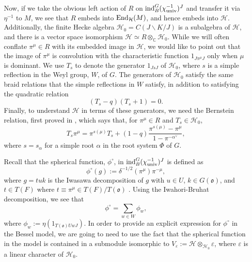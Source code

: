 \documentclass[11pt,letterpaper]{article}
\newcommand{\C}{\mathbb{C}}
\newcommand{\calH}{\mathcal{H}} %
\newcommand{\ve}{\varepsilon}
\newcommand{\bs}{\backslash}
\newcommand{\goth}{\mathfrak}
\newcommand{\End}{\textup{End}}
\newcommand{\ind}{\textup{ind}}
\theoremstyle{remark}
\numberwithin{equation}{section}
\begin{document}
Now, if we take the obvious left action of $R$ on $\ind_B^G(\chi_{\textup{univ}}^{-1})^J$ and transfer it via $\eta^{-1}$ to $M$, we see that $R$ embeds into $\End_{\calH}(M)$, and hence embeds into $\calH$. Additionally, the finite Hecke algebra $\calH_0 = C(J\bs K/J)$ is a subalgebra of $\calH$, and there is a vector space isomorphism $\calH \simeq R \otimes_{\C} \calH_0$. While we will often conflate $\pi^{\mu} \in R$ with its embedded image in $\calH$, we would like to point out that the image of $\pi^{\mu}$ is convolution with the characteristic function $1_{J\pi^{\mu}J}$ only when $\mu$ is dominant. We use $T_{s}$ to denote the generator $1_{JsJ}$ of $\calH_0$, where $s$ is a simple reflection in the Weyl group, $W$, of $G$. The generators of $\calH_0$ satisfy the same braid relations that the simple reflections in $W$ satisfy, in addition to satisfying the quadratic relation $$(T_s - q)(T_s + 1) = 0.$$ Finally, to understand $\calH$ in terms of these generators, we need the Bernstein relation, first proved in \cite{Lusz}, which says that, for $\pi^{\mu} \in R$ and $T_s \in \calH_0$, \begin{equation} \label{bernstein} T_s\pi^{\mu} = \pi^{s(\mu)}T_s + (1-q)\frac{\pi^{s(\mu)}-\pi^{\mu}}{1-\pi^{-\alpha^{\vee}}}, \end{equation} where $s = s_{\alpha}$ for a simple root $\alpha$ in the root system $\Phi$ of $G$.

\begin{comment}
we want to get left $\calH$ action so that we can see how $\calH$ decomposes as $R\calH_0$?
\end{comment}

Recall that the spherical function, $\phi^{\circ}$, in $\ind_B^G(\chi_{\textup{univ}}^{-1})^J$ is defined as $$\phi^{\circ}(g) := \delta^{-1/2}(\pi^{\mu})\pi^{-\mu},$$ where $g = tuk$ is the Iwasawa decomposition of $g$ with $u \in U$, $k \in G(\goth{o})$, and $t \in T(F)$ where $t \equiv \pi^{\mu} \in T(F)/T(\goth{o})$ . Using the Iwahori-Bruhat decomposition, we see that $$\phi^{\circ} = \sum_{w \in W} \phi_w,$$ where $\phi_w := \eta(1_{T(\goth{o})UwJ})$. In order to provide an explicit expression for $\phi^{\circ}$ in the Bessel model, we are going to need to use the fact that the spherical function in the model is contained in a submodule isomorphic to $V_{\ve} :=\calH \otimes_{\calH_0} \ve$, where $\ve$ is a linear character of $\calH_0$. %
\end{document}
